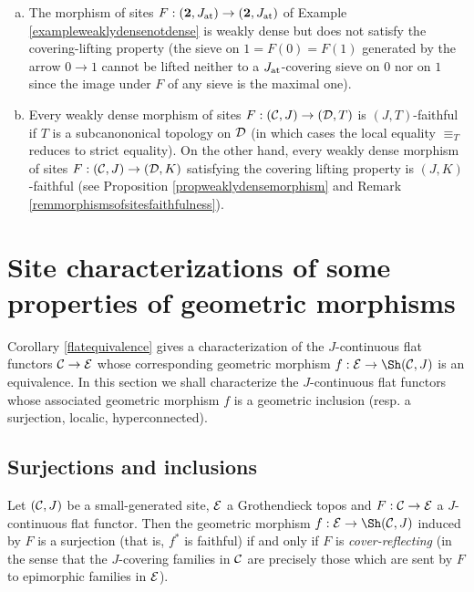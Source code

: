 \documentclass[a4paper,12pt]{article}
\begin{document}
\begin{remarks}\label{remweaklydense}	
	\begin{enumerate}[(a)]
		\item The morphism of sites $F:({\mathbf{2}}, J_{\textup{at}})\to ({\mathbf{2}}, J_{\textup{at}})$ of Example \ref{exampleweaklydensenotdense} is weakly dense but does not satisfy the covering-lifting property (the sieve on $1=F(0)=F(1)$ generated by the arrow $0\to 1$ cannot be lifted neither to a $J_{\textup{at}}$-covering sieve on $0$ nor on $1$ since the image under $F$ of any sieve is the maximal one).
		
		\item Every weakly dense morphism of sites $F:({\cal C}, J)\to ({\cal D}, T)$ is $(J, T)$-faithful if $T$ is a subcanononical topology on $\cal D$ (in which cases the local equality $\equiv_{T}$ reduces to strict equality). On the other hand, every weakly dense morphism of sites $F:({\cal C}, J)\to ({\cal D}, K)$ satisfying the covering lifting property is $(J, K)$-faithful (see Proposition \ref{propweaklydensemorphism} and Remark \ref{remmorphismsofsitesfaithfulness}).  
	\end{enumerate}
	
\end{remarks}


\section{Site characterizations of some properties of geometric morphisms}\label{sec:propgeometricmorphisms}

Corollary \ref{flatequivalence} gives a characterization of the $J$-continuous flat  functors ${\cal C}\to {\cal E}$ whose corresponding geometric morphism $f:{\cal E}\to \Sh({\cal C}, J)$ is an equivalence. In this section we shall characterize the $J$-continuous flat  functors whose associated geometric morphism $f$ is a geometric inclusion (resp. a surjection, localic, hyperconnected).  

\subsection{Surjections and inclusions}\label{secsurjectioninclusion}

\begin{proposition}\label{propcoverreflecting}
	Let $({\cal C}, J)$ be a small-generated site, $\cal E$ a Grothendieck topos and $F:{\cal C}\to {\cal E}$ a $J$-continuous flat  functor. Then the geometric morphism $f:{\cal E}\to \Sh({\cal C}, J)$ induced by $F$ is a surjection (that is, $f^{\ast}$ is faithful) if and only if $F$ is \emph{cover-reflecting} (in the sense that the $J$-covering families in $\cal C$ are precisely those which are sent by $F$ to epimorphic families in $\cal E$).
\end{proposition}
\end{document}
